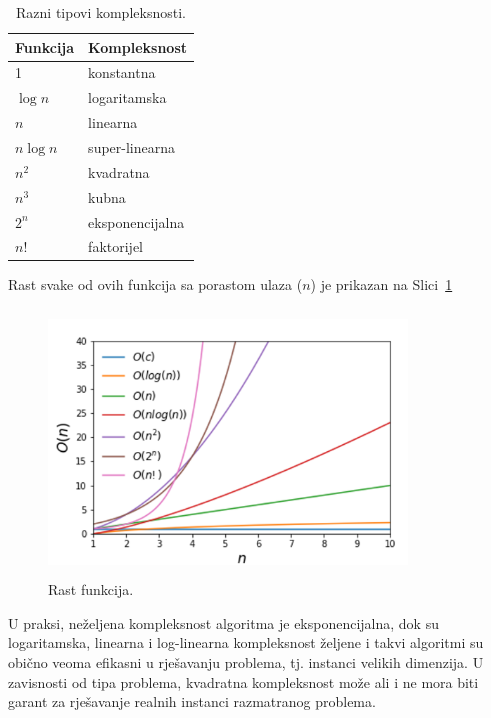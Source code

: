  \begin{table}[H]
 	\centering
 	\begin{tabular}{l |l}
 		\textbf{Funkcija}   & \textbf{Kompleksnost} \\ \hline
 		1          & konstantna \\
 		$\log n$   & logaritamska \\
 		$n$        &  linearna \\
 		$n \log n$ & super-linearna  \\
 		$n^2$      & kvadratna \\
 		$n^3$      & kubna \\
 		$2^n $     & eksponencijalna \\ 
 		$n!$       & faktorijel \\
 		\hline
  	\end{tabular}
 
  \caption{Razni tipovi kompleksnosti. }  \label{tab:kompleksnosti}
 \end{table}
 Rast svake od ovih funkcija sa porastom ulaza ($n$) je prikazan na Slici~\ref{fig:kompleksnosti_funkcije}
 \begin{figure}[H]
 	\centering
 	\includegraphics[width=270pt,height=200pt]{slike/growth.png}%
   \caption{Rast funkcija. }  \label{fig:kompleksnosti_funkcije}
 \end{figure}


U praksi, neželjena kompleksnost algoritma je eksponencijalna, dok su logaritamska, linearna i log-linearna kompleksnost željene i takvi algoritmi su obično veoma efikasni u rješavanju problema, tj. instanci velikih dimenzija. U zavisnosti od tipa problema, kvadratna kompleksnost može ali i ne mora biti garant za rješavanje realnih instanci razmatranog  problema. %


